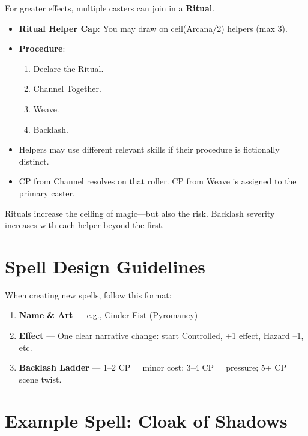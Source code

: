 For greater effects, multiple casters can join in a \textbf{Ritual}.

\begin{itemize}
  \item \textbf{Ritual Helper Cap}: You may draw on ceil(Arcana/2) helpers (max 3).
  \item \textbf{Procedure}:
  \begin{enumerate}
    \item Declare the Ritual.
    \item Channel Together.
    \item Weave.
    \item Backlash.
  \end{enumerate}
  \item Helpers may use different relevant skills if their procedure is fictionally distinct.
  \item CP from Channel resolves on that roller. CP from Weave is assigned to the primary caster.
\end{itemize}

Rituals increase the ceiling of magic—but also the risk. Backlash severity increases with each helper beyond the first.

\section{Spell Design Guidelines}

When creating new spells, follow this format:

\begin{enumerate}
  \item \textbf{Name \& Art} — e.g., Cinder-Fist (Pyromancy)
  \item \textbf{Effect} — One clear narrative change: start Controlled, +1 effect, Hazard –1, etc.
  \item \textbf{Backlash Ladder} — 1–2 CP = minor cost; 3–4 CP = pressure; 5+ CP = scene twist.
\end{enumerate}

\section{Example Spell: Cloak of Shadows}

